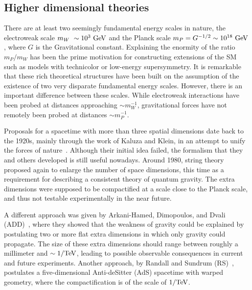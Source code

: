 \subsection{Higher dimensional theories}
\label{subsec:theory:bsm:qbh}

There are at least two seemingly fundamental energy scales in nature, the electroweak scale \(m_{W}~\sim 10^3~\text{GeV}\) and the Planck scale \(m_P = G^{-1/2} \sim 10^{18}~\text{GeV}\), where \(G\) is the Gravitational constant. Explaining the enormity of the ratio \(m_P / m_W\) has been the prime motivation for constructing extensions of the \ac{SM} such as models with technicolor or low-energy supersymmetry. It is remarkable that these rich theoretical structures have been built on the assumption of the existence of two very disparate fundamental energy scales. However, there is an important difference between these scales. While electroweak interactions have been probed at distances approaching \(\sim m_W^{-1}\), gravitational forces have not remotely been probed at distances \(\sim m_P^{-1}\).

Proposals for a spacetime with more than three spatial dimensions date back to the 1920s, mainly through the work of Kaluza and Klein, in an attempt to unify the forces of nature~\cite{Bailin_Love-1987}. Although their initial idea failed, the formalism that they and others developed is still useful nowadays. Around 1980, string theory proposed again to enlarge the number of space dimensions, this time as a requirement for describing a consistent theory of quantum gravity. The extra dimensions were supposed to be compactified at a scale close to the Planck scale, and thus not testable experimentally in the near future.

A different approach was given by Arkani-Hamed, Dimopoulos, and Dvali (ADD)~\cite{ADD-1998}, where they showed that the weakness of gravity could be explained by postulating two or more flat extra dimensions in which only gravity could propagate. The size of these extra dimensions should range between roughly a millimeter and \(\sim 1/\text{TeV}\), leading to possible observable consequences in current and future experiments. Another approach, by Randall and Sundrum (RS)~\cite{RS1-1999_1,RS1-1999_2}, postulates a five-dimensional Anti-deSitter (AdS) spacetime with warped geometry, where the compactification is of the scale of \(1/\text{TeV}\).


